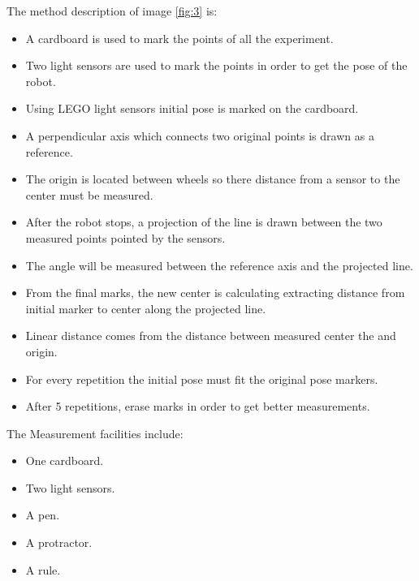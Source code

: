 \documentclass[10pt]{scrartcl}
\begin{document}
The method description of image \ref{fig:3} is:
\begin{itemize}
	\item A cardboard is used to mark the points of all the experiment.
	\item Two light sensors are used to mark the points in order to get the pose of the robot.
	\item Using LEGO light sensors initial pose is marked on the cardboard.
	\item A perpendicular axis which connects two original points is drawn as a reference.
	\item The origin is located between wheels so there distance from a sensor to the center must be measured. 
	\item After the robot stops, a projection of the line is drawn between the two measured points pointed by the sensors.
	\item The angle will be measured between the reference axis and the projected line.
	\item From the final marks, the new center is calculating extracting distance from initial marker to center along the projected line.
	\item Linear distance comes from the distance between measured center the and origin.
	\item For every repetition the initial pose must fit the original pose markers.	
	\item After 5 repetitions, erase marks in order to get better measurements.
\end{itemize}

The Measurement facilities include:

\begin{itemize}
	\item One cardboard.
	\item Two light sensors.
	\item A pen.
	\item A protractor.
	\item A rule.
\end{itemize}
\end{document}
